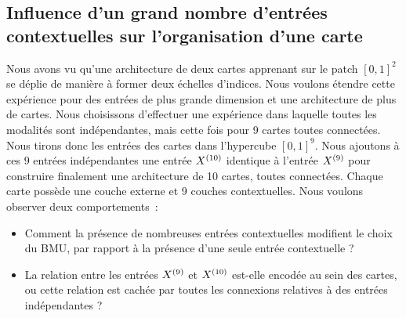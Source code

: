 \documentclass[../main]{subfiles}
\begin{document}
\subsection{Influence d'un grand nombre d'entrées contextuelles sur l'organisation d'une carte}

Nous avons vu qu'une architecture de deux cartes apprenant sur le patch $[0,1]^2$ se déplie de manière à former deux échelles d'indices. 
Nous voulons étendre cette expérience pour des entrées de plus grande dimension et une architecture de plus de cartes. 
Nous choisissons d'effectuer une expérience dans laquelle toutes les modalités sont indépendantes, mais cette fois pour 9 cartes toutes connectées.
Nous tirons donc les entrées des cartes dans l'hypercube $[0,1]^9$. 
Nous ajoutons à ces $9$ entrées indépendantes une entrée $X^{({10})}$ identique à l'entrée $X^{({9})}$ pour construire finalement une architecture de 10 cartes, toutes connectées. Chaque carte possède une couche externe et 9 couches contextuelles.
Nous voulons observer deux comportements~: 
\begin{itemize}
	\item Comment la présence de nombreuses entrées contextuelles modifient le choix du BMU, par rapport à la présence d'une seule entrée contextuelle ? 
	\item La relation entre les entrées $X^{({9})}$ et $X^{({10})}$ est-elle encodée au sein des cartes, ou cette relation est cachée par toutes les connexions relatives à des entrées indépendantes ? 
\end{itemize}
\end{document}
